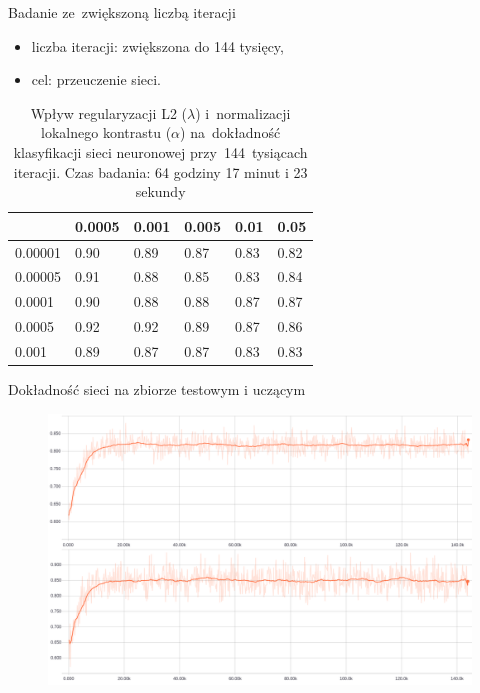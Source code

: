 \documentclass[xcolor=dvipsnames]{beamer}
\begin{document}
\begin{frame}{Badanie ze~zwiększoną liczbą iteracji}
    \begin{itemize}
        \item liczba iteracji: zwiększona do 144 tysięcy,
        \item cel: przeuczenie sieci.
    \end{itemize}
    \begin{table}[H]
        \centering
        \begin{tabular}{|l|l|l|l|l|l|}
            \hline
            \backslashbox{$\alpha$}{$\lambda$} & \cellcolor{orange!25}0.0005 & \cellcolor{orange!25}0.001 & 0.005 & 0.01 & 0.05 \\
            \hline
            0.00001 & 0.90 & 0.89 & 0.87 & 0.83 & 0.82 \\
            \hline
            0.00005 & 0.91 & 0.88 & 0.85 & 0.83 & 0.84 \\
            \hline
            0.0001  & 0.90 & 0.88 & 0.88 & 0.87 & 0.87 \\
            \hline
            \cellcolor{orange!25}0.0005  & 0.92 & 0.92 & 0.89 & 0.87 & 0.86 \\
            \hline
            0.001   & 0.89 & 0.87 & 0.87 & 0.83 & 0.83 \\
            \hline
        \end{tabular}
        \caption{Wpływ regularyzacji L2 ($\lambda$) i~normalizacji lokalnego kontrastu ($\alpha$) na~dokładność klasyfikacji
        sieci neuronowej przy~144~tysiącach iteracji. Czas badania: 64 godziny 17 minut i 23 sekundy}
        \label{table:wyniki2}
    \end{table}
\end{frame}
\begin{frame}{Dokładność sieci na zbiorze testowym i uczącym}
  \begin{figure}
    \includegraphics[width=\textwidth]{img/badanie_2.png}
  \end{figure}
\end{frame}
\end{document}
